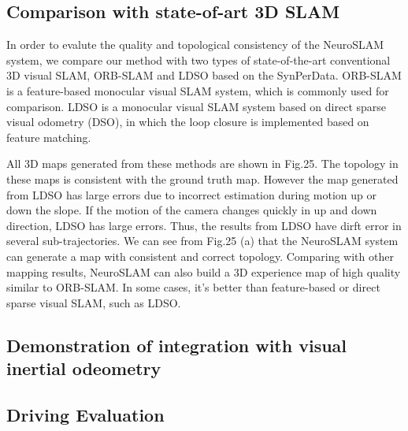\subsection{Comparison with state-of-art 3D SLAM}

In order to evalute the quality and topological consistency of the NeuroSLAM system, we compare our method with two types of state-of-the-art conventional 3D visual SLAM, ORB-SLAM and LDSO based on the SynPerData.
ORB-SLAM is a feature-based monocular visual SLAM system, which is commonly used for comparison.
LDSO is a monocular visual SLAM system based on direct sparse visual odometry (DSO), in which the loop closure is implemented based on feature matching.


All 3D maps generated from these methods are shown in Fig.25.
The topology in these maps is consistent with the ground truth map.
However the map generated from LDSO has large errors due to incorrect estimation during motion up or down the slope.
If the motion of the camera changes quickly in up and down direction, LDSO has large errors.
Thus, the results from LDSO have dirft error in several sub-trajectories.
We can see from Fig.25 (a) that the NeuroSLAM system can generate a map with consistent and correct topology.
Comparing with other mapping results, NeuroSLAM can also build a 3D experience map of high quality similar to ORB-SLAM.
In some cases, it's better than feature-based or direct sparse visual SLAM, such as LDSO.




\subsection{Demonstration of integration with visual inertial odeometry}









\subsection{Driving Evaluation}
\label{sec:Metrics}



